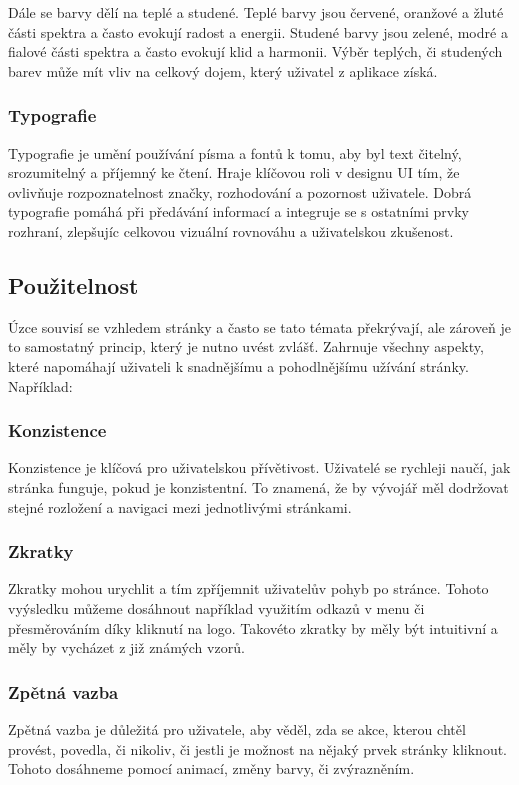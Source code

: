 Dále se barvy dělí na teplé a studené. Teplé barvy jsou červené, oranžové a žluté části spektra a často evokují radost a energii. Studené barvy jsou zelené, modré a fialové části spektra a často evokují klid a harmonii. Výběr teplých, či studených barev může mít vliv na celkový dojem, který uživatel z aplikace získá.\cite{color_theory_design} 

\subsubsection{Typografie}
Typografie je umění používání písma a fontů k tomu, aby byl text čitelný, srozumitelný a příjemný ke čtení. Hraje klíčovou roli v designu UI tím, že ovlivňuje rozpoznatelnost značky, rozhodování a pozornost uživatele. Dobrá typografie pomáhá při předávání informací a integruje se s ostatními prvky rozhraní, zlepšujíc celkovou vizuální rovnováhu a uživatelskou zkušenost.\cite{typography}

\subsection{Použitelnost}
Úzce souvisí se vzhledem stránky a často se tato témata překrývají, ale zároveň je to samostatný princip, který je nutno uvést zvlášť. Zahrnuje všechny aspekty, které napomáhají uživateli k snadnějšímu a pohodlnějšímu užívání stránky. Například:\cite{principles_of_ui_design}

\subsubsection*{Konzistence}
Konzistence je klíčová pro uživatelskou přívětivost. Uživatelé se rychleji naučí, jak stránka funguje, pokud je konzistentní. To znamená, že by vývojář měl dodržovat stejné rozložení a navigaci mezi jednotlivými stránkami.

\subsubsection*{Zkratky}
Zkratky mohou urychlit a tím zpříjemnit uživatelův pohyb po stránce. Tohoto vyýsledku můžeme dosáhnout například využitím odkazů v menu či přesměrováním díky kliknutí na logo. Takovéto zkratky by měly být intuitivní a měly by vycházet z již známých vzorů.

\subsubsection*{Zpětná vazba}
Zpětná vazba je důležitá pro uživatele, aby věděl, zda se akce, kterou chtěl provést, povedla, či nikoliv, či jestli je možnost na nějaký prvek stránky kliknout. Tohoto dosáhneme pomocí animací, změny barvy, či zvýrazněním.

